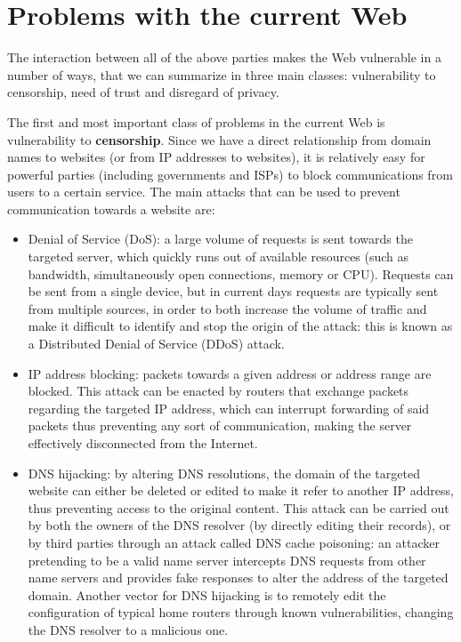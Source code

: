 \documentclass[mscthesis]{usiinfthesis}
\begin{document}
\section{Problems with the current Web} \label{sec:problems}
The interaction between all of the above parties makes the Web vulnerable in a number of ways, that we can summarize in three main classes: vulnerability to censorship, need of trust and disregard of privacy.

The first and most important class of problems in the current Web is vulnerability to \textbf{censorship}. Since we have a direct relationship from domain names to websites (or from IP addresses to websites), it is relatively easy for powerful parties (including governments and ISPs) to block communications from users to a certain service.
The main attacks that can be used to prevent communication towards a website are:
\begin{itemize}
	\item Denial of Service (DoS): a large volume of requests is sent towards the targeted server, which quickly runs out of available resources (such as bandwidth, simultaneously open connections, memory or CPU). Requests can be sent from a single device, but in current days requests are typically sent from multiple sources, in order to both increase the volume of traffic and make it difficult to identify and stop the origin of the attack: this is known as a Distributed Denial of Service (DDoS) attack.
	\item IP address blocking: packets towards a given address or address range are blocked. This attack can be enacted by routers that exchange packets regarding the targeted IP address, which can interrupt forwarding of said packets thus preventing any sort of communication, making the server effectively disconnected from the Internet.
	\item DNS hijacking: by altering DNS resolutions, the domain of the targeted website can either be deleted or edited to make it refer to another IP address, thus preventing access to the original content. This attack can be carried out by both the owners of the DNS resolver (by directly editing their records), or by third parties through an attack called DNS cache poisoning: an attacker pretending to be a valid name server intercepts DNS requests from other name servers and provides fake responses to alter the address of the targeted domain. Another vector for DNS hijacking is to remotely edit the configuration of typical home routers through known vulnerabilities, changing the DNS resolver to a malicious one.
\end{itemize}
\end{document}

